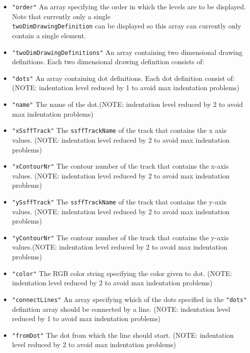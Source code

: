 \documentclass[]{book}
\begin{document}
\begin{itemize}
\begin{itemize}
\begin{itemize}
      \begin{itemize}
      \item
        \texttt{"order"} An array specifying the order in which the
        levels are to be displayed. Note that currently only a
        single\\
        \texttt{twoDimDrawingDefinition} can be displayed so this array
        can currently only contain a single element.
      \item
        \texttt{"twoDimDrawingDefinitions"} An array containing two
        dimensional drawing definitions. Each two dimensional
        drawing definition consists of:
      \item
        \texttt{"dots"} An array containing dot definitions. Each dot definition consist of: (NOTE: indentation level reduced by 1 to avoid max indentation problems)
      \item
        \texttt{"name"} The name of the dot.(NOTE: indentation level reduced by 2 to avoid max indentation problems)
      \item
        \texttt{"xSsffTrack"} The \texttt{ssffTrackName} of the track that contains the x axis values. (NOTE: indentation level reduced by 2 to avoid max indentation problems)
      \item
        \texttt{"xContourNr"} The contour number of the track that contains the x-axis values. (NOTE: indentation level reduced by 2 to avoid max indentation problems)
      \item
        \texttt{"ySsffTrack"} The \texttt{ssffTrackName} of the track that contains the y-axis values. (NOTE: indentation level reduced by 2 to avoid max indentation problems)
      \item
        \texttt{"yContourNr"} The contour number of the track that contains the y-axis values.(NOTE: indentation level reduced by 2 to avoid max indentation problems)
      \item
        \texttt{"color"} The RGB color string specifying the color given to dot. (NOTE: indentation level reduced by 2 to avoid max indentation problems)
      \item
        \texttt{"connectLines"} An array specifying which of the dots specified in the \texttt{"dots"} definition array should be connected by a line. (NOTE: indentation level reduced by 1 to avoid max indentation problems)
      \item
        \texttt{"fromDot"} The dot from which the line should start. (NOTE: indentation level reduced by 2 to avoid max indentation problems)

\end{itemize}
\end{itemize}
\end{itemize}
\end{itemize}
\end{document}
